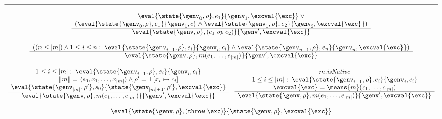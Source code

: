 \begin{figure}
\begin{displaymath}
\begin{array}{c}
\hline
\ \\
\begin{array}{c}
\eval{\state{\genv_0,\rho},e_1}{\genv_1,\excval{\exc}} \; \vee \\
(\eval{\state{\genv_0,\rho},e_1}{\genv_1,c} \wedge \eval{\state{\genv_1,\rho},e_2}{\genv_2,\excval{\exc}}) \\
\hline
\eval{\state{\genv,\rho},{(e_1\;\mathit{op}\;e_2)}}{\genv',\excval{\exc}}
\end{array} \\
\ \\
\begin{array}{c}
((n \leq |m|) \wedge 1 \leq i \leq n:\;\eval{\state{\genv_{i-1},\rho},e_i}{\genv_i,c_i} \wedge \eval{\state{\genv_{n-1},\rho},e_n}{\genv_n,\excval{\exc}})  \\
\hline
\eval{\state{\genv,\rho},m(e_1,\ldots,e_{|m|})}{\genv',\excval{\exc}}
\end{array} \\
\ \\
\begin{array}{c}
1 \leq i \leq |m|:\;\eval{\state{\genv_{i-1},\rho},e_i}{\genv_i,c_i} \\
\|m\| = \langle s_0,x_1,\ldots,x_{|m|} \rangle \wedge
\rho' = \bot[x_i \mapsto c_i] \\
\eval{\state{\genv_{|m|},\rho'},s_0}{\state{\genv_{|m|+1 },\rho'},\excval{\exc}} \\
\hline
\eval{\state{\genv,\rho},m(e_1,\ldots,e_{|m|})}{\genv',\excval{\exc}}
\end{array} 
\;\;\;
\begin{array}{c}
m.\mathit{isNative}  \\
1 \leq i \leq |m|:\;\eval{\state{\genv_{i-1},\rho},e_i}{\genv_i,c_i} \\
\excval{\exc} = \means{m}(c_1,\ldots,c_{|m|}) \\
\hline
\eval{\state{\genv,\rho},m(e_1,\ldots,e_{|m|})}{\genv',\excval{\exc}}
\end{array} \\
\ \\
\eval{\state{\genv,\rho},{(\texttt{throw}\; \exc)}}{\state{\genv,\rho},\excval{\exc}} \\

\end{array}
\end{displaymath}
\end{figure}
